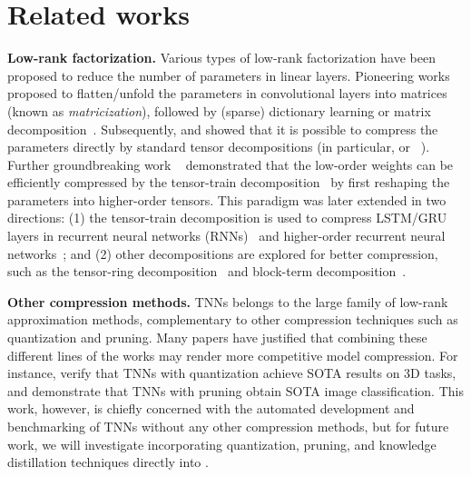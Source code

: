 \section{Related works}
\label{sec:related}

\textbf{Low-rank factorization.} 
Various types of low-rank factorization have been proposed to reduce the number of parameters in linear layers.
Pioneering works proposed to flatten/unfold the parameters in convolutional layers into matrices (known as {\em matricization}), followed by (sparse) dictionary learning or matrix decomposition~\citep{jaderberg2014speeding, denton2014exploiting, zhang2015efficient}.
Subsequently, \citet{lebedev2015speeding} and \citet{kim2015compression} showed that it is possible
to compress the parameters directly by standard tensor decompositions
(in particular, \CPDlong or \TKDLong~\citep{kolda2009tensor}).
Further groundbreaking work ~\citep{novikov2015tensorizing, garipov2016ultimate} demonstrated that the low-order weights can be efficiently compressed by the tensor-train decomposition~\citep{oseledets2011tensor} by first reshaping the parameters into higher-order tensors.
This paradigm was later extended in two directions: (1) the tensor-train decomposition is used to compress LSTM/GRU layers in recurrent neural networks (RNNs)~\citep{yang2017tensor} and higher-order recurrent neural networks~\citep{yu2017long, su2020convolutional}; and (2) other decompositions are explored for better compression, 
such as the tensor-ring decomposition~\citep{zhao2016tensor} and block-term decomposition~\citep{ye2020block}.

\textbf{Other compression methods.} 
{TNNs belongs to the large family of low-rank approximation methods, complementary to other compression techniques such as quantization and pruning. Many papers have justified that combining these different lines of the works may render more competitive model compression. For instance, \cite{lee2021qttnet} verify that TNNs with quantization achieve SOTA results on 3D tasks, and \cite{goyal2019compression} demonstrate that TNNs with pruning obtain SOTA image classification. This work, however, is chiefly concerned with the automated development and benchmarking of TNNs without any other compression methods, but for future work, we will investigate incorporating quantization, pruning, and knowledge distillation techniques directly into \autotnn.}

